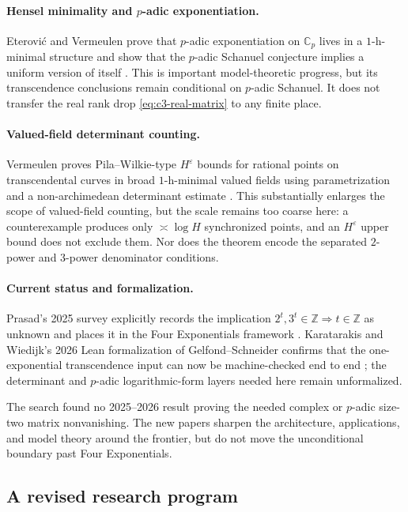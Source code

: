 \documentclass[11pt,oneside]{article}
\theoremstyle{definition}
\theoremstyle{remark}
\newcommand{\Z}{\mathbb Z}
\newcommand{\C}{\mathbb C}
\begin{document}
\paragraph{Hensel minimality and $p$-adic exponentiation.}
Eterovi\'c and Vermeulen prove that $p$-adic exponentiation on $\C_p$ lives in a
$1$-h-minimal structure and show that the $p$-adic Schanuel conjecture implies a uniform
version of itself \cite{EterovicVermeulen2026}.  This is important model-theoretic progress,
but its transcendence conclusions remain conditional on $p$-adic Schanuel.  It does not
transfer the real rank drop \eqref{eq:c3-real-matrix} to any finite place.

\paragraph{Valued-field determinant counting.}
Vermeulen proves Pila--Wilkie-type $H^\varepsilon$ bounds for rational points on
transcendental curves in broad $1$-h-minimal valued fields using parametrization and a
non-archimedean determinant estimate \cite{Vermeulen2025}.  This substantially enlarges the
scope of valued-field counting, but the scale remains too coarse here: a counterexample
produces only $\asymp\log H$ synchronized points, and an $H^\varepsilon$ upper bound does not
exclude them.  Nor does the theorem encode the separated $2$-power and $3$-power denominator
conditions.

\paragraph{Current status and formalization.}
Prasad's 2025 survey explicitly records the implication
$2^t,3^t\in\Z\Rightarrow t\in\Z$ as unknown and places it in the Four Exponentials framework
\cite{Prasad2025}.  Karatarakis and Wiedijk's 2026 Lean formalization of
Gelfond--Schneider confirms that the one-exponential transcendence input can now be
machine-checked end to end \cite{KaratarakisWiedijk2026}; the determinant and $p$-adic
logarithmic-form layers needed here remain unformalized.

The search found no 2025--2026 result proving the needed complex or $p$-adic size-two matrix
nonvanishing.  The new papers sharpen the architecture, applications, and model theory around
the frontier, but do not move the unconditional boundary past Four Exponentials.

\subsection{A revised research program}
\label{sec:c3-program}
\end{document}

